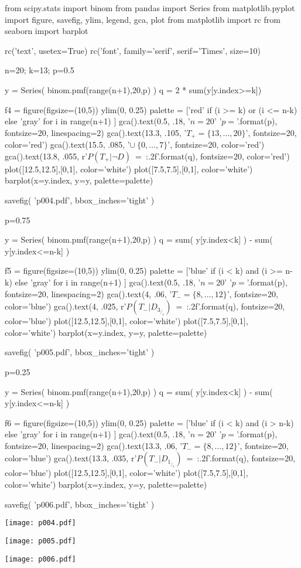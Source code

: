 \documentclass[10pt,openany]{book}
\theoremstyle{mio}
\theoremstyle{liscio}
\begin{document}
\begin{pycode}
from scipy.stats import binom
from pandas import Series
from matplotlib.pyplot import figure, savefig, ylim, legend, gca, plot
from matplotlib import rc
from seaborn import barplot

rc('text', usetex=True)
rc('font', family='serif', serif='Times', size=10)


n=20; k=13; p=0.5

y = Series( binom.pmf(range(n+1),20,p) )
q = 2 * sum(y[y.index>=k])

f4 = figure(figsize=(10,5))
ylim(0, 0.25)
palette = ['red' if (i >= k) or (i <= n-k) else 'gray' for i in range(n+1) ]
gca().text(0.5, .18, '$n=20$\n' '$p={}$'.format(p), fontsize=20, linespacing=2)
gca().text(13.3, .105, '$T_+=\{13,\dots,20\}$', fontsize=20, color='red')
gca().text(15.5, .085, '$\cup\ \{0,\dots,7\}$', fontsize=20, color='red')
gca().text(13.8, .055, r'$P(T_+|\neg D)$\ =\ {:.2f}'.format(q), fontsize=20, color='red')
plot([12.5,12.5],[0,1], color='white')
plot([7.5,7.5],[0,1], color='white')
barplot(x=y.index, y=y, palette=palette)

savefig( 'p004.pdf', bbox_inches='tight' )

p=0.75

y = Series( binom.pmf(range(n+1),20,p) )
q = sum( y[y.index<k] ) -  sum( y[y.index<=n-k] )

f5 = figure(figsize=(10,5))
ylim(0, 0.25)
palette = ['blue' if (i < k) and (i >= n-k) else 'gray' for i in range(n+1) ]
gca().text(0.5, .18, '$n=20$\n' '$p={}$'.format(p), fontsize=20, linespacing=2)
gca().text(4, .06, '$T_-=\{8,\dots,12\}$', fontsize=20, color='blue')
gca().text(4, .025, r'$P(T_-|D_3 _/ _4)$\ =\ {:.2f}'.format(q), fontsize=20, color='blue')
plot([12.5,12.5],[0,1], color='white')
plot([7.5,7.5],[0,1], color='white')
barplot(x=y.index, y=y, palette=palette)


savefig( 'p005.pdf', bbox_inches='tight' )


p=0.25

y = Series( binom.pmf(range(n+1),20,p) )
q = sum( y[y.index<k] ) -  sum( y[y.index<=n-k] )

f6 = figure(figsize=(10,5))
ylim(0, 0.25)
palette = ['blue' if (i < k) and (i > n-k) else 'gray' for i in range(n+1) ]
gca().text(0.5, .18, '$n=20$\n' '$p={}$'.format(p), fontsize=20, linespacing=2)
gca().text(13.3, .06, '$T_-=\{8,\dots,12\}$', fontsize=20, color='blue')
gca().text(13.3, .035, r'$P(T_-|D_1 _/ _4)$\ =\ {:.2f}'.format(q), fontsize=20, color='blue')
plot([12.5,12.5],[0,1], color='white')
plot([7.5,7.5],[0,1], color='white')
barplot(x=y.index, y=y, palette=palette)


savefig( 'p006.pdf', bbox_inches='tight' )


\end{pycode}
\hfil\texttt{[image: p004.pdf]}

\hfil\texttt{[image: p005.pdf]}

\hfil\texttt{[image: p006.pdf]}
\end{document}
